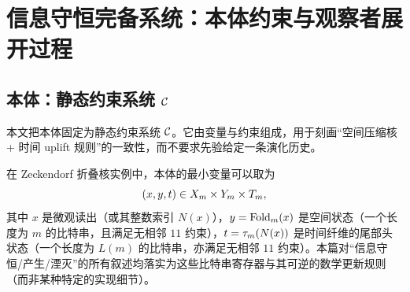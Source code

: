 \section{信息守恒完备系统：本体约束与观察者展开过程}

\subsection{本体：静态约束系统 \texorpdfstring{$\mathcal{C}$}{C}}
本文把本体固定为静态约束系统 \(\mathcal{C}\)。它由变量与约束组成，用于刻画“空间压缩核 + 时间 uplift 规则”的一致性，而不要求先验给定一条演化历史。

在 Zeckendorf 折叠核实例中，本体的最小变量可以取为
$$
(x,y,t)\in X_m\times Y_m\times T_m,
$$
其中 \(x\) 是微观读出（或其整数索引 \(N(x)\)），\(y=\mathrm{Fold}_m(x)\) 是空间状态（一个长度为 \(m\) 的比特串，且满足无相邻 \(11\) 约束），\(t=\tau_m(N(x))\) 是时间纤维的尾部头状态（一个长度为 \(L(m)\) 的比特串，亦满足无相邻 \(11\) 约束）。本篇对“信息守恒/产生/湮灭”的所有叙述均落实为这些比特串寄存器与其可逆的数学更新规则（而非某种特定的实现细节）。

